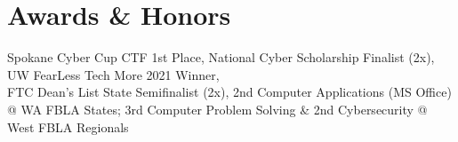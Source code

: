 \section{Awards \& Honors}
\small{
}
\begin{itemize}[leftmargin=0.15in, label={}]
	\small{\item{
		Spokane Cyber Cup CTF 1st Place, National Cyber Scholarship Finalist (2x), UW FearLess Tech More 2021 Winner, \\ FTC Dean’s List State Semifinalist (2x), 2nd Computer Applications (MS Office) @ WA FBLA States; 3rd Computer Problem Solving \& 2nd Cybersecurity @ West FBLA Regionals
	}}
    \end{itemize}